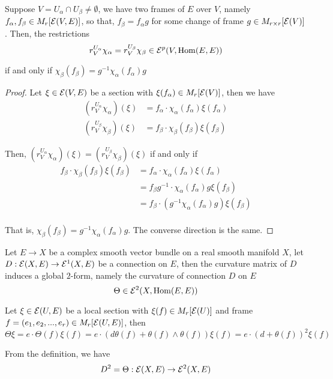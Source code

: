 \begin{lemma}
	Suppose $V = U_\alpha \cap U_\beta \neq \emptyset$, we have two frames of $E$ over $V$, namely $f_\alpha, f_\beta \in M_r[\mathcal{E}(V, E)]$, so that, $f_\beta = f_\alpha g$ for some change of frame $g \in M_{r \times r}[\mathcal{E}(V)]$. Then, the restrictions
	$$
		r^{U_\alpha}_V \chi_\alpha = r^{U_\beta}_V \chi_\beta \in \mathcal{E}^p(V, \operatorname{Hom}(E, E))
	$$
	
	if and only if $\chi_\beta(f_\beta) = g^{-1} \chi_\alpha(f_\alpha) g$
	\begin{proof}
		Let $\xi \in \mathcal{E}(V, E)$ be a section with $\xi(f_\alpha) \in M_r[\mathcal{E}(V)]$, then we have
		\begin{align*}
			(r^{U_\alpha}_V \chi_\alpha) (\xi) &= f_\alpha \cdot \chi_\alpha(f_\alpha) \xi(f_\alpha) \\
			(r^{U_\beta}_V \chi_\beta) (\xi) &= f_\beta \cdot \chi_\beta(f_\beta) \xi(f_\beta)
		\end{align*}
		
		Then, $(r^{U_\alpha}_V \chi_\alpha) (\xi) = (r^{U_\beta}_V \chi_\beta) (\xi)$ if and only if
		\begin{align*}
			f_\beta \cdot \chi_\beta(f_\beta) \xi(f_\beta)
			&= f_\alpha \cdot \chi_\alpha(f_\alpha) \xi(f_\alpha) \\
			&= f_\beta g^{-1} \cdot \chi_\alpha(f_\alpha) g \xi(f_\beta) \\
			&= f_\beta \cdot (g^{-1} \chi_\alpha(f_\alpha) g) \xi(f_\beta) \\
		\end{align*}
		
		That is, $\chi_\beta(f_\beta) = g^{-1} \chi_\alpha(f_\alpha) g$. The converse direction is the same.
	\end{proof}
\end{lemma}

\begin{definition}[curvature]
	Let $E \to X$ be a complex smooth vector bundle on a real smooth manifold $X$, let $D: \mathcal{E}(X, E) \to \mathcal{E}^1(X, E)$ be a connection on $E$, then the curvature matrix of $D$ induces a global $2$-form, namely the curvature of connection $D$ on $E$
	$$
		\Theta \in \mathcal{E}^2(X, \operatorname{Hom}(E, E))
	$$
	
	Let $\xi \in \mathcal{E}(U, E)$ be a local section with $\xi(f) \in M_r[\mathcal{E}(U)]$ and frame $f = (e_1, e_2, ..., e_r) \in M_r[\mathcal{E}(U, E)]$, then
	$$
		\Theta \xi = e \cdot \Theta(f) \xi(f) = e \cdot (d \theta(f) + \theta(f) \wedge \theta(f)) \xi(f) = e \cdot (d + \theta(f))^2 \xi(f)
	$$
	
	From the definition, we have
	$$
		D^2 = \Theta: \mathcal{E}(X, E) \to \mathcal{E}^2(X, E)
	$$
\end{definition}

